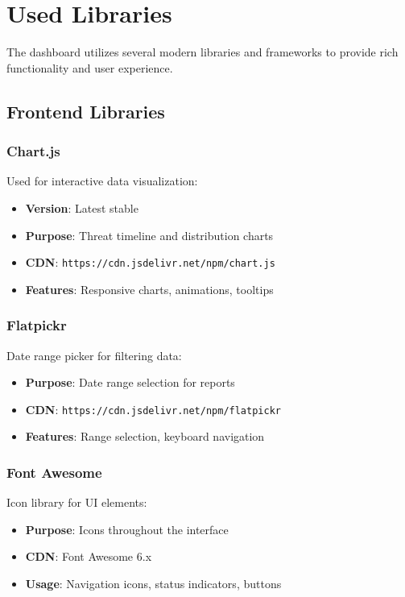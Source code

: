 \documentclass[12pt,a4paper]{report}
\begin{document}
\section{Used Libraries}

The dashboard utilizes several modern libraries and frameworks to provide rich functionality and user experience.

\subsection{Frontend Libraries}

\subsubsection{Chart.js}
Used for interactive data visualization:
\begin{itemize}
    \item \textbf{Version}: Latest stable
    \item \textbf{Purpose}: Threat timeline and distribution charts
    \item \textbf{CDN}: \texttt{https://cdn.jsdelivr.net/npm/chart.js}
    \item \textbf{Features}: Responsive charts, animations, tooltips
\end{itemize}

\subsubsection{Flatpickr}
Date range picker for filtering data:
\begin{itemize}
    \item \textbf{Purpose}: Date range selection for reports
    \item \textbf{CDN}: \texttt{https://cdn.jsdelivr.net/npm/flatpickr}
    \item \textbf{Features}: Range selection, keyboard navigation
\end{itemize}

\subsubsection{Font Awesome}
Icon library for UI elements:
\begin{itemize}
    \item \textbf{Purpose}: Icons throughout the interface
    \item \textbf{CDN}: Font Awesome 6.x
    \item \textbf{Usage}: Navigation icons, status indicators, buttons
\end{itemize}
\end{document}
